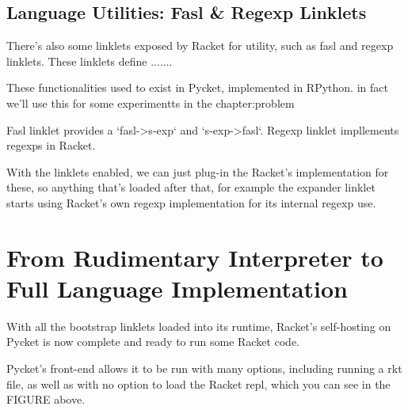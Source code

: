 		\subsection{Language Utilities: Fasl \& Regexp Linklets}

			\begin{paragraph-here}%
				There's also some linklets exposed by Racket for utility, such as fasl and regexp linklets. These linklets define .......
			\end{paragraph-here}

			\begin{paragraph-here}%
				These functionalities used to exist in Pycket, implemented in RPython. in fact we'll use this for some experimentts in the chapter:problem
			\end{paragraph-here}

			\begin{paragraph-here}%
				Fasl linklet provides a `fasl->s-exp` and `s-exp->fasl`. Regexp linklet impllements regexps in Racket.
			\end{paragraph-here}

			\begin{paragraph-here}%
				With the linklets enabled, we can just plug-in the Racket's implementation for these, so anything that's loaded after that, for example the expander linklet starts using Racket's own regexp implementation for its internal regexp use.
			\end{paragraph-here}



	\section[\texorpdfstring{From Rudimentary Interpreter to Full Language Implementation}{Pycket as Full Racket}]{From Rudimentary Interpreter to Full Language Implementation}


		\begin{paragraph-here}%
			With all the bootstrap linklets loaded into its runtime, Racket's self-hosting on Pycket is now complete and ready to run some Racket code.
		\end{paragraph-here}

		\begin{paragraph-here}%
			Pycket's front-end allows it to be run with many options, including running a rkt file, as well as with no option to load the Racket repl, which you can see in the FIGURE above.
		\end{paragraph-here}

